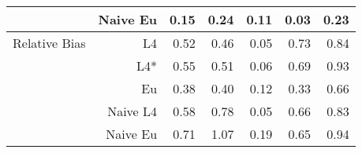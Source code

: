 \documentclass[a4paper,12pt,twoside]{book}
\begin{document}
\begin{table}[H]
\begin{tabular}{crrrrrr}
&Naive Eu &  0.15 & 0.24 & 0.11 & 0.03 & 0.23 \\ 
 
   \hline
   
{\color{blue} Relative Bias } & L4  &0.52 & 0.46 & 0.05 & 0.73 & 0.84 \\ 
  
&L4*  &0.55 & 0.51 & 0.06 & 0.69 & 0.93 \\ 
  
  
&Eu &  
    0.38 & 0.40 & 0.12 & 0.33 & 0.66 \\ 
 
&Naive L4&  
  
  0.58 & 0.78 & 0.05 & 0.66 & 0.83 \\ 
 
  
&Naive Eu &  
   0.71 & 1.07 & 0.19 & 0.65 & 0.94 \\ 
  
  
\end{tabular}

\end{table}
\end{document}
